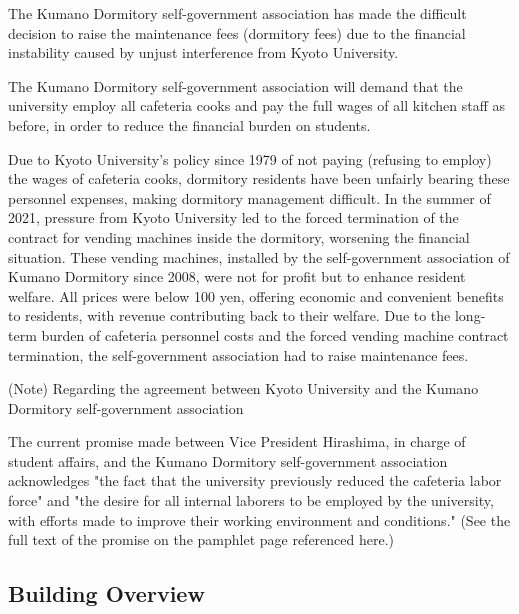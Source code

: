     \begin{tcolorbox}[colback=white, colbacktitle=gray!30!white, coltitle=black, title=Regarding the 200 yen increase in dormitory fees from April 2022,breakable]
      \setlength{\parindent}{1zw}
      \small{The Kumano Dormitory self-government association has made the difficult decision to raise the maintenance fees (dormitory fees) due to the financial instability caused by unjust interference from Kyoto University.
      
      The Kumano Dormitory self-government association will demand that the university employ all cafeteria cooks and pay the full wages of all kitchen staff as before, in order to reduce the financial burden on students.
      
      Due to Kyoto University's policy since 1979 of not paying (refusing to employ) the wages of cafeteria cooks, dormitory residents have been unfairly bearing these personnel expenses, making dormitory management difficult. In the summer of 2021, pressure from Kyoto University led to the forced termination of the contract for vending machines inside the dormitory, worsening the financial situation. These vending machines, installed by the self-government association of Kumano Dormitory since 2008, were not for profit but to enhance resident welfare. All prices were below 100 yen, offering economic and convenient benefits to residents, with revenue contributing back to their welfare. Due to the long-term burden of cafeteria personnel costs and the forced vending machine contract termination, the self-government association had to raise maintenance fees.

      \noindent (Note) Regarding the agreement between Kyoto University and the Kumano Dormitory self-government association
  
      The current promise made between Vice President Hirashima, in charge of student affairs, and the Kumano Dormitory self-government association acknowledges "the fact that the university previously reduced the cafeteria labor force" and "the desire for all internal laborers to be employed by the university, with efforts made to improve their working environment and conditions." (See the full text of the promise on the pamphlet page referenced here.)}

    \end{tcolorbox}


		\subsection{Building Overview}
